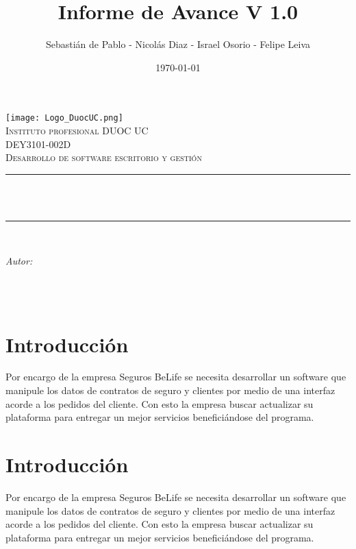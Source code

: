 \documentclass[letterpaper]{article}
\title{Informe de Avance V 1.0}
\author{Sebastián de Pablo
- Nicolás Diaz
- Israel Osorio
- Felipe Leiva
}
\date{\today}
\makeatletter
\let\thetitle\@title
\let\theauthor\@author
\let\thedate\@date
\makeatother
\begin{document}
\begin{titlepage}
	\centering
    \vspace*{0.0 cm}

\texttt{[image: Logo\_DuocUC.png]}\\[1.0 cm]	
\textsc{\LARGE Instituto profesional DUOC UC}\\[2.0 cm]	
	\textsc{\Large DEY3101-002D}\\[0.5 cm]				
	\textsc{\large Desarrollo de software escritorio y gestión}\\[0.5 cm]	
	\rule{\linewidth}{0.2 mm} \\[0.4 cm]
	{ \huge \bfseries \thetitle}\\
	\rule{\linewidth}{0.2 mm} \\[1.5 cm]
	
	\begin{minipage}{0.4\textwidth}
		\begin{center} \large
			\emph{Autor:}\\
			\theauthor\linebreak
			\end{center}
	\end{minipage}\\[2 cm]
	
	{\large \thedate}\\[2 cm]
 
	\vfill
	
\end{titlepage}


\tableofcontents
\pagebreak

\section{Introducción}
Por encargo de la empresa Seguros BeLife se necesita desarrollar un software que manipule los datos de contratos de seguro y clientes por medio de una interfaz acorde a los pedidos del cliente. Con esto la empresa buscar actualizar su plataforma para entregar un mejor servicios beneficiándose del programa.
\section{Introducción}
Por encargo de la empresa Seguros BeLife se necesita desarrollar un software que manipule los datos de contratos de seguro y clientes por medio de una interfaz acorde a los pedidos del cliente. Con esto la empresa buscar actualizar su plataforma para entregar un mejor servicios beneficiándose del programa.
\end{document}
